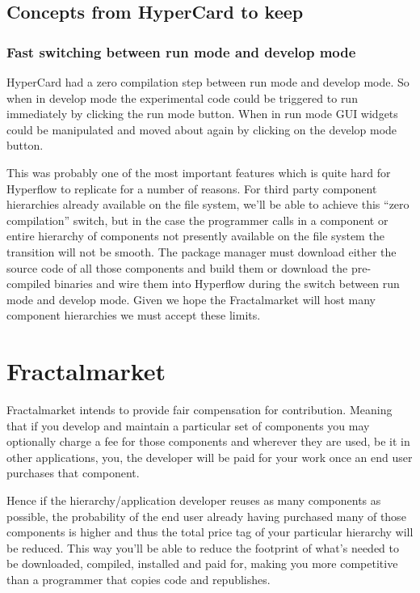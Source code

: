 \documentclass[%
 aip,
 jmp,%
 amsmath,amssymb,
 reprint,%
]{revtex4-1}
\begin{document}
\subsection{\label{sec:level2}Concepts from HyperCard to keep}
\subsubsection{\label{sec:level3}Fast switching between run mode and develop mode}

HyperCard had a zero compilation step between run mode and develop mode. So when in develop mode the experimental code could be triggered to run immediately by clicking the run mode button. When in run mode GUI widgets could be manipulated and moved about again by clicking on the develop mode button.

This was probably one of the most important features which is quite hard for Hyperflow to replicate for a number of reasons. For third party component hierarchies already available on the file system, we'll be able to achieve this ``zero compilation'' switch, but in the case the programmer calls in a component or entire hierarchy of components not presently available on the file system the transition will not be smooth. The package manager must download either the source code of all those components and build them or download the pre-compiled binaries and wire them into Hyperflow during the switch between run mode and develop mode. Given we hope the Fractalmarket will host many component hierarchies we must accept these limits.



\section{\label{sec:level1}Fractalmarket}

Fractalmarket intends to provide fair compensation for contribution. Meaning that if you develop and maintain a particular set of components you may optionally charge a fee for those components and wherever they are used, be it in other applications, you, the developer will be paid for your work once an end user purchases that component.

Hence if the hierarchy/application developer reuses as many components as possible, the probability of the end user already having purchased many of those components is higher and thus the total price tag of your particular hierarchy will be reduced. This way you'll be able to reduce the footprint of what's needed to be downloaded, compiled, installed and paid for, making you more competitive than a programmer that copies code and republishes.
\end{document}
